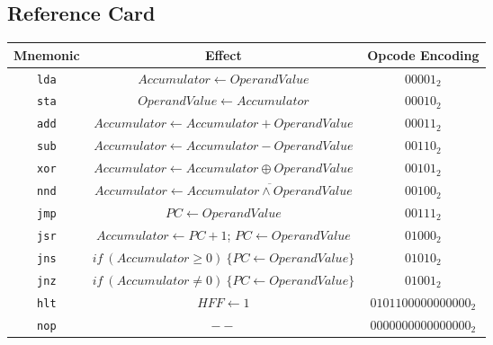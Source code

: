 \pagebreak
\subsection{Reference Card}\label{subsec:reference-card2}
\renewcommand{\arraystretch}{2.0}
\begin{center}
    \begin{adjustbox}{width=\textwidth}
        \begin{tabular}{ |c|c|c| }
            \hline
            Mnemonic & Effect & Opcode Encoding \\ \hline
            \texttt{lda} & $Accumulator \leftarrow OperandValue$ & $00001_{2}$ \\ \hline
            \texttt{sta} & $OperandValue \leftarrow Accumulator $ & $00010_{2}$\\ \hline
            \texttt{add} & $Accumulator \leftarrow Accumulator + OperandValue$ & $00011_{2}$\\ \hline
            \texttt{sub} & $Accumulator \leftarrow Accumulator - OperandValue$ & $00110_{2}$\\ \hline
            \texttt{xor} & $Accumulator \leftarrow Accumulator \oplus OperandValue$ & $00101_{2}$\\ \hline
            \texttt{nnd} & $Accumulator \leftarrow \overline{Accumulator \land OperandValue}$ & $00100_{2}$\\ \hline
            \texttt{jmp} & $PC \leftarrow OperandValue$ & $00111_{2}$\\ \hline

            \texttt{jsr} & $Accumulator \leftarrow PC + 1$; $PC \leftarrow OperandValue$ & $01000_{2}$\\ \hline
            \texttt{jns} & $if\ (Accumulator \geq 0)\ \{ PC \leftarrow OperandValue \}$ & $01010_{2}$\\ \hline
            \texttt{jnz} & $if\ (Accumulator \neq 0)\ \{ PC \leftarrow OperandValue \}$ & $01001_{2}$\\ \hline


            \texttt{hlt} & $HFF \leftarrow 1$ & $0101100000000000_{2}$\\ \hline
            \texttt{nop} & $ -- $ & $0000000000000000_{2}$\\ \hline

        \end{tabular}
    \end{adjustbox}
\end{center}
\pagebreak